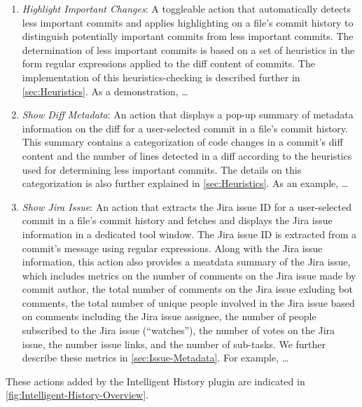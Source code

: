 \begin{enumerate}[label=(\Alph*)]
    \item \textit{Highlight Important Changes}: A toggleable action that automatically detects less important commits and applies highlighting on a file's commit history to distinguish potentially important commits from less important commits. The determination of less important commits is based on a set of heuristics in the form regular expressions applied to the diff content of commits. The implementation of this heuristics-checking is described further in \autoref{sec:Heuristics}. As a demonstration, \dots {}
    \item \textit{Show Diff Metadata}: An action that displays a pop-up summary of metadata information on the diff for a user-selected commit in a file's commit history. This summary contains a categorization of code changes in a commit's diff content and the number of lines detected in a diff according to the heuristics used for determining less important commits. The details on this categorization is also further explained in \autoref{sec:Heuristics}. As an example, \dots {}
    \item \textit{Show Jira Issue}: An action that extracts the Jira issue ID for a user-selected commit in a file's commit history and fetches and displays the Jira issue information in a dedicated tool window. The Jira issue ID is extracted from a commit's message using regular expressions. Along with the Jira issue information, this action also provides a meatdata summary of the Jira issue, which includes metrics on the number of comments on the Jira issue made by commit author, the total number of comments on the Jira issue exluding bot comments, the total number of unique people involved in the Jira issue based on comments including the Jira issue assignee, the number of people subscribed to the Jira issue (``watches''), the number of votes on the Jira issue, the number issue links, and the number of sub-tasks. We further describe these metrics in \autoref{sec:Issue-Metadata}. For example, \dots {}
\end{enumerate}

These actions added by the Intelligent History plugin are indicated in \autoref{fig:Intelligent-History-Overview}.

